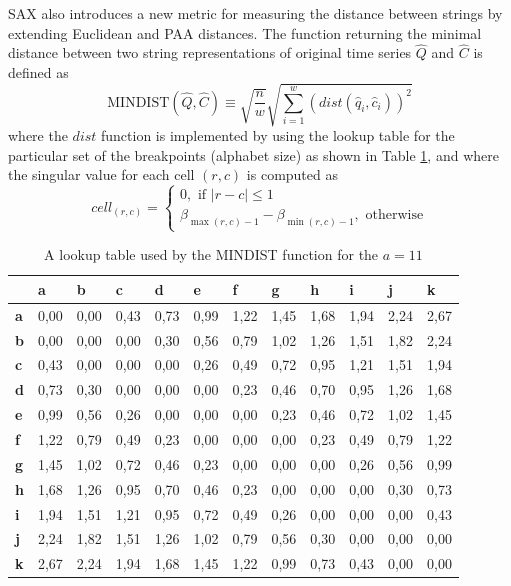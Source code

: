 SAX also introduces a new metric for measuring the distance between strings by extending Euclidean and PAA \cite{citeulike:2946589} distances. 
The function returning the minimal distance between two string representations of original time series $\widehat{Q}$ and $\widehat{C}$ 
is defined as
\begin{equation}
\text{MINDIST}(\widehat{Q},\widehat{C}) \equiv \sqrt{ \frac{n}{w} } \sqrt{ \sum_{i=1}^{w} ( dist( \widehat{q}_{i}, \widehat{c}_{i} ) )^{2}}
\label{eq:sax_mindist}
\end{equation} 
where the $dist$ function is implemented by using the lookup table for the particular set of the breakpoints (alphabet size) as shown in 
Table \ref{tbl:sax_lookup}, and where the singular value for each cell $(r,c)$ is computed as 
\begin{equation}
cell_{(r,c)} = 
\begin{cases} 
0, \text{ if }\left| r-c \right| \leq 1 \\
\beta_{\max(r,c) - 1} - \beta_{\min(r,c) - 1}, \text{ otherwise}
\end{cases}
\label{eq:cell}
\end{equation}


\begin{table}
\caption{A lookup table used by the MINDIST function for the $a=11$}
\label{tbl:sax_lookup}
\small
\begin{tabularx}{\textwidth}{|l|X|X|X|X|X|X|X|X|X|X|X|}
\hline
&\textbf{a}&\textbf{b}&\textbf{c}&\textbf{d}&\textbf{e}&\textbf{f}&\textbf{g}&\textbf{h}&\textbf{i}&\textbf{j}&\textbf{k} \\
\hline
\textbf{a}& 0,00 & 0,00 & 0,43 & 0,73 & 0,99 & 1,22 & 1,45 & 1,68 & 1,94 & 2,24 & 2,67 \\
\hline
\textbf{b}& 0,00 & 0,00 & 0,00 & 0,30 & 0,56 & 0,79 & 1,02 & 1,26 & 1,51 & 1,82 & 2,24 \\
\hline
\textbf{c}& 0,43 & 0,00 & 0,00 & 0,00 & 0,26 & 0,49 & 0,72 & 0,95 & 1,21 & 1,51 & 1,94 \\ 
\hline
\textbf{d}& 0,73 & 0,30 & 0,00 & 0,00 & 0,00 & 0,23 & 0,46 & 0,70 & 0,95 & 1,26 & 1,68 \\ 
\hline
\textbf{e}& 0,99 & 0,56 & 0,26 & 0,00 & 0,00 & 0,00 & 0,23 & 0,46 & 0,72 & 1,02 & 1,45 \\ 
\hline
\textbf{f}& 1,22 & 0,79 & 0,49 & 0,23 & 0,00 & 0,00 & 0,00 & 0,23 & 0,49 & 0,79 & 1,22 \\ 
\hline
\textbf{g}& 1,45 & 1,02 & 0,72 & 0,46 & 0,23 & 0,00 & 0,00 & 0,00 & 0,26 & 0,56 & 0,99 \\ 
\hline
\textbf{h}& 1,68 & 1,26 & 0,95 & 0,70 & 0,46 & 0,23 & 0,00 & 0,00 & 0,00 & 0,30 & 0,73 \\ 
\hline
\textbf{i}& 1,94 & 1,51 & 1,21 & 0,95 & 0,72 & 0,49 & 0,26 & 0,00 & 0,00 & 0,00 & 0,43 \\ 
\hline
\textbf{j}& 2,24 & 1,82 & 1,51 & 1,26 & 1,02 & 0,79 & 0,56 & 0,30 & 0,00 & 0,00 & 0,00 \\ 
\hline
\textbf{k}& 2,67 & 2,24 & 1,94 & 1,68 & 1,45 & 1,22 & 0,99 & 0,73 & 0,43 & 0,00 & 0,00 \\ 
\hline
\end{tabularx}
\end{table}


